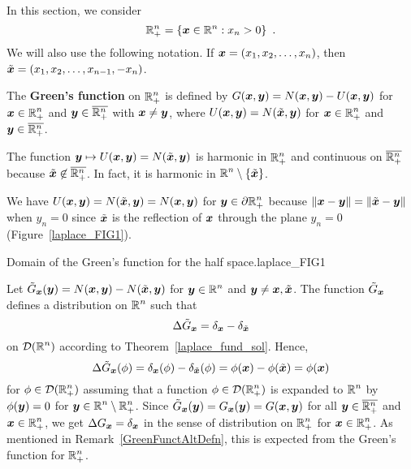 In this section, we consider
\[
\mathbb{R}^n_+ = \left\{ {\bm{x}} \in \mathbb{R}^n : x_n >0 \right\} \ .
\]
We will also use the following notation.  If
${\bm{x}} = (x_1, x_2, \ldots, x_n)$, then
$\tilde{{\bm{x}}} = (x_1, x_2, \ldots, x_{n-1}, -x_n)$.

The {\bfseries Green's function} on
$\displaystyle \mathbb{R}^n_+$ is defined by
$G({\bm{x}},{\bm{y}}) = N({\bm{x}},{\bm{y}}) - U({\bm{x}},{\bm{y}})$
for $\displaystyle {\bm{x}} \in \mathbb{R}_+^n$ and
$\displaystyle {\bm{y}} \in \overline{\mathbb{R}^n_+}$ with
${\bm{x}} \neq {\bm{y}}$, where
$U({\bm{x}},{\bm{y}}) = N(\tilde{{\bm{x}}}, {\bm{y}})$
for $\displaystyle {\bm{x}} \in \mathbb{R}_+^n$ and
$\displaystyle {\bm{y}} \in \overline{\mathbb{R}^n_+}$.

 The function
${\bm{y}} \mapsto U({\bm{x}},{\bm{y}}) =
N(\tilde{{\bm{x}}},{\bm{y}})$ is harmonic in $\displaystyle \mathbb{R}^n_+$ and
continuous on $\displaystyle \overline{\mathbb{R}^n_+}$ because
$\displaystyle \tilde{{\bm{x}}} \not\in \overline{\mathbb{R}^n_+}$.
In fact, it is harmonic in $\displaystyle \mathbb{R}^n \setminus \{\tilde{{\bm{x}}}\}$.

 We have
$U({\bm{x}},{\bm{y}}) = N(\tilde{{\bm{x}}},{\bm{y}}) = N({\bm{x}},{\bm{y}})$ for
$\displaystyle {\bm{y}} \in \partial \mathbb{R}^n_+$ because
$\|{\bm{x}}-{\bm{y}}\| = \|\tilde{{\bm{x}}}-{\bm{y}}\|$ when $y_n=0$ since
$\tilde{{\bm{x}}}$ is the reflection of ${\bm{x}}$ through the
plane $y_n=0$ (Figure~\ref{laplace_FIG1}).

{Domain of the Green's function for the half space.}{laplace_FIG1}

Let $\tilde{G}_{{\bm{x}}}({\bm{y}}) =
N({\bm{x}},{\bm{y}}) - N(\tilde{{\bm{x}}},{\bm{y}})$
for $\displaystyle {\bm{y}} \in \mathbb{R}^n$ and ${\bm{y}}\neq {\bm{x}},\tilde{{\bm{x}}}$.
The function $\tilde{G}_{{\bm{x}}}$ defines a distribution on
$\displaystyle \mathbb{R}^n$ such that
\[
\Delta \tilde{G}_{{\bm{x}}} = \delta_{{\bm{x}}} - \delta_{\tilde{{\bm{x}}}}
\]
on $\displaystyle \mathcal{D}(\mathbb{R}^n)$ according to
Theorem~\ref{laplace_fund_sol}.  Hence,
\[
\Delta \tilde{G}_{{\bm{x}}}(\phi) = \delta_{{\bm{x}}}(\phi) -
\delta_{\tilde{{\bm{x}}}}(\phi)
= \phi({\bm{x}}) - \phi(\tilde{{\bm{x}}}) = \phi({\bm{x}})
\]
for $\displaystyle \phi \in \mathcal{D}(\mathbb{R}^n_+)$ assuming that a function
$\displaystyle \phi \in \mathcal{D}(\mathbb{R}^n_+)$ is expanded to $\displaystyle \mathbb{R}^n$
by $\phi({\bm{y}})=0$ for
$\displaystyle {\bm{y}} \in \mathbb{R}^n \setminus \mathbb{R}^n_+$.  Since
$\tilde{G}_{{\bm{x}}}({\bm{y}}) = G_{{\bm{x}}}({\bm{y}}) = G({\bm{x}},{\bm{y}})$
for all $\displaystyle {\bm{y}} \in \overline{\mathbb{R}^n_+}$ and
$\displaystyle {\bm{x}}\in \mathbb{R}_+^n$, we get
$\Delta G_{{\bm{x}}} = \delta_{{\bm{x}}}$ in the sense of distribution
on $\displaystyle \mathbb{R}^n_+$ for $\displaystyle {\bm{x}}\in \mathbb{R}_+^n$.
As mentioned in Remark~\ref{GreenFunctAltDefn}, this is expected from
the Green's function for $\displaystyle \mathbb{R}^n_+$.

